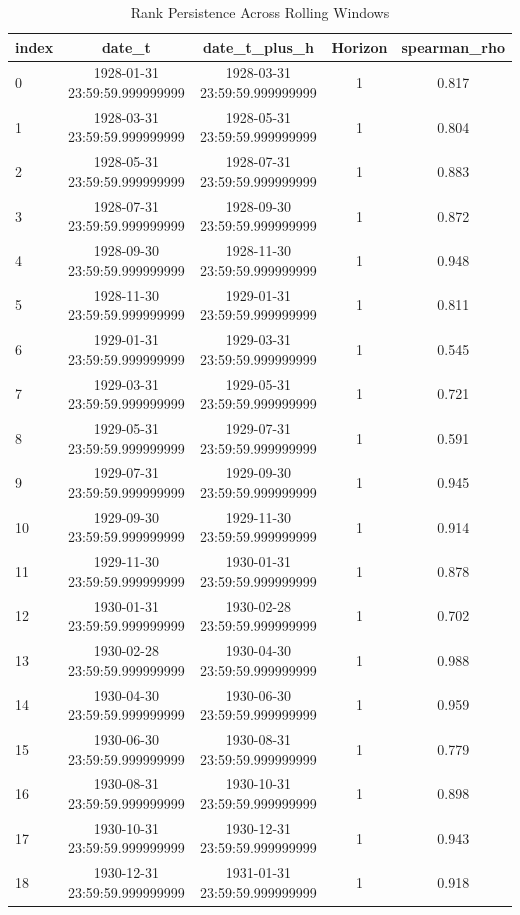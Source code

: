 \begin{table}
\caption{Rank Persistence Across Rolling Windows}
\label{tab:rank_persistence}
\begin{tabular}{lcccc}
\toprule
index & date_t & date_t_plus_h & Horizon & spearman_rho \\
\midrule
0 & 1928-01-31 23:59:59.999999999 & 1928-03-31 23:59:59.999999999 & 1 & 0.817 \\
1 & 1928-03-31 23:59:59.999999999 & 1928-05-31 23:59:59.999999999 & 1 & 0.804 \\
2 & 1928-05-31 23:59:59.999999999 & 1928-07-31 23:59:59.999999999 & 1 & 0.883 \\
3 & 1928-07-31 23:59:59.999999999 & 1928-09-30 23:59:59.999999999 & 1 & 0.872 \\
4 & 1928-09-30 23:59:59.999999999 & 1928-11-30 23:59:59.999999999 & 1 & 0.948 \\
5 & 1928-11-30 23:59:59.999999999 & 1929-01-31 23:59:59.999999999 & 1 & 0.811 \\
6 & 1929-01-31 23:59:59.999999999 & 1929-03-31 23:59:59.999999999 & 1 & 0.545 \\
7 & 1929-03-31 23:59:59.999999999 & 1929-05-31 23:59:59.999999999 & 1 & 0.721 \\
8 & 1929-05-31 23:59:59.999999999 & 1929-07-31 23:59:59.999999999 & 1 & 0.591 \\
9 & 1929-07-31 23:59:59.999999999 & 1929-09-30 23:59:59.999999999 & 1 & 0.945 \\
10 & 1929-09-30 23:59:59.999999999 & 1929-11-30 23:59:59.999999999 & 1 & 0.914 \\
11 & 1929-11-30 23:59:59.999999999 & 1930-01-31 23:59:59.999999999 & 1 & 0.878 \\
12 & 1930-01-31 23:59:59.999999999 & 1930-02-28 23:59:59.999999999 & 1 & 0.702 \\
13 & 1930-02-28 23:59:59.999999999 & 1930-04-30 23:59:59.999999999 & 1 & 0.988 \\
14 & 1930-04-30 23:59:59.999999999 & 1930-06-30 23:59:59.999999999 & 1 & 0.959 \\
15 & 1930-06-30 23:59:59.999999999 & 1930-08-31 23:59:59.999999999 & 1 & 0.779 \\
16 & 1930-08-31 23:59:59.999999999 & 1930-10-31 23:59:59.999999999 & 1 & 0.898 \\
17 & 1930-10-31 23:59:59.999999999 & 1930-12-31 23:59:59.999999999 & 1 & 0.943 \\
18 & 1930-12-31 23:59:59.999999999 & 1931-01-31 23:59:59.999999999 & 1 & 0.918 \\

\end{tabular}
\end{table}
